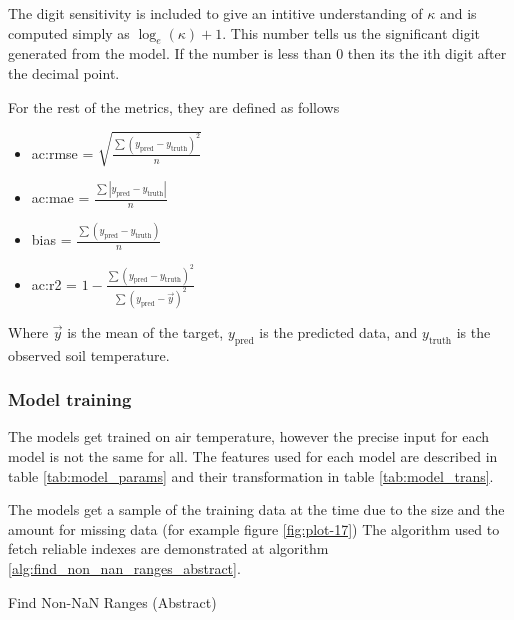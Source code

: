 The digit sensitivity is included to give an intitive understanding of $\kappa$ and is computed simply as $\log_e(\kappa)+1$. This number tells us the significant digit generated from the model. If the number is less than 0 then its the ith digit after the decimal point.

For the rest of the metrics, they are defined as follows
\begin{itemize}
	\item \gls{ac:rmse} = $\sqrt{\frac{\sum (y_{\text{pred}} - y_{\text{truth}})^2}{n}}$
	\item \gls{ac:mae} = $\frac{\sum \left| y_{\text{pred}} - y_{\text{truth}}\right|}{n}$
	\item bias = $\frac{\sum ( y_{\text{pred}} - y_{\text{truth}})}{n}$
	\item \gls{ac:r2} = $1-\frac{\sum (y_{\text{pred}} - y_{\text{truth}})^2}{\sum (y_{\text{pred}} - \vec{y})^2}$
\end{itemize}

Where $\vec{y}$ is the mean of the target, $y_{\text{pred}}$ is the predicted data, and $y_{\text{truth}}$ is the observed soil temperature.

\subsubsection{Model training}

The models get trained on air temperature, however the precise input for each model is not the same for all. The features used for each model are described in table \ref{tab:model_params} and their transformation in table \ref{tab:model_trans}.

The models get a sample of the training data at the time due to the size and the amount for missing data (for example figure \ref{fig:plot-17}) The algorithm used to fetch reliable indexes are demonstrated at algorithm \ref{alg:find_non_nan_ranges_abstract}.

\begin{algorithm}
	\caption{Find Non-NaN Ranges (Abstract)}
	\label{alg:find_non_nan_ranges_abstract}
	
	
	\BlankLine
	
\end{algorithm}



